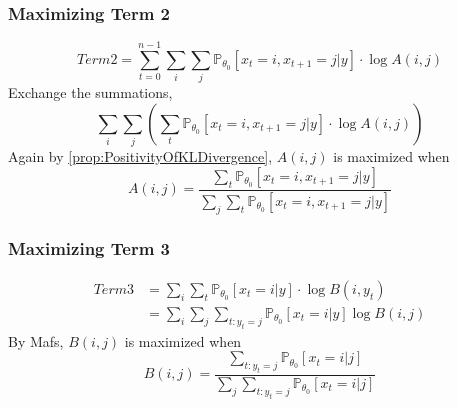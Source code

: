         \subsubsection{Maximizing Term 2}
        \[ Term2 = \sum_{t=0}^{n-1}\sum_i\sum_j \mathbb{P}_{\theta_0}[x_t=i,x_{t+1}=j|y] \cdot \log A(i,j) \]
        Exchange the summations,
        \[ \sum_i\sum_j \left(\sum_t \mathbb{P}_{\theta_0}[x_t=i,x_{t+1}=j|y] \cdot \log A(i,j)\right) \]
        Again by \ref{prop:PositivityOfKLDivergence}, $A(i,j)$ is maximized when
        \[ A(i,j) = \frac{\sum_t \mathbb{P}_{\theta_0}[x_t=i,x_{t+1}=j|y]}{\sum_j\sum_t \mathbb{P}_{\theta_0}[x_t=i,x_{t+1}=j|y]} \]

        \subsubsection{Maximizing Term 3}
        \begin{align*}
            Term3 &= \sum_i \sum_t \mathbb{P}_{\theta_0}[x_t=i|y]\cdot\log B(i,y_t)\\
            &= \sum_i \sum_j \sum_{t:y_t=j}\mathbb{P}_{\theta_0}[x_t=i|y]\log B(i,j)
        \end{align*}
        By Mafs, $B(i,j)$ is maximized when
        \[ B(i,j) = \frac{\sum_{t:y_t=j}\mathbb{P}_{\theta_0}[x_t=i|j]}{\sum_j\sum_{t:y_t=j}\mathbb{P}_{\theta_0}[x_t=i|j]} \]
